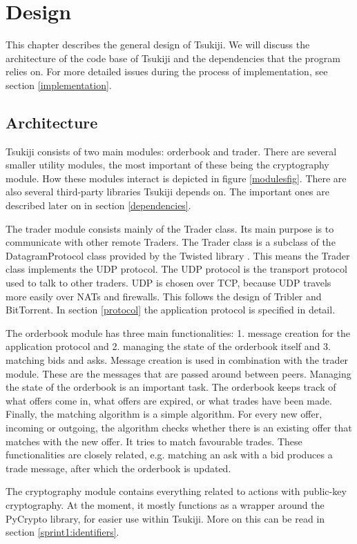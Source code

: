\section{Design}
This chapter describes the general design of Tsukiji.
We will discuss the architecture of the code base of Tsukiji and the dependencies that the program relies on.
For more detailed issues during the process of implementation, see section \ref{implementation}.

\subsection{Architecture}
Tsukiji consists of two main modules: orderbook and trader.
There are several smaller utility modules, the most important of these being the cryptography module.
How these modules interact is depicted in figure \ref{modulesfig}.
There are also several third-party libraries Tsukiji depends on.
The important ones are described later on in section \ref{dependencies}.

The trader module consists mainly of the Trader class.
Its main purpose is to communicate with other remote Traders.
The Trader class is a subclass of the DatagramProtocol class provided by the Twisted library \cite{twisted}.
This means the Trader class implements the UDP protocol.
The UDP protocol is the transport protocol used to talk to other traders.
UDP is chosen over TCP, because UDP travels more easily over NATs and firewalls.
This follows the design of Tribler and BitTorrent.
In section \ref{protocol} the application protocol is specified in detail.

The orderbook module has three main functionalities: 1. message creation for the application protocol and 2. managing the state of the orderbook itself and 3. matching bids and asks.
Message creation is used in combination with the trader module.
These are the messages that are passed around between peers.
Managing the state of the orderbook is an important task.
The orderbook keeps track of what offers come in, what offers are expired, or what trades have been made.
Finally, the matching algorithm is a simple algorithm.
For every new offer, incoming or outgoing, the algorithm checks whether there is an existing offer that matches with the new offer.
It tries to match favourable trades.
These functionalities are closely related, e.g. matching an ask with a bid produces a trade message, after which the orderbook is updated.

The cryptography module contains everything related to actions with public-key cryptography.
At the moment, it mostly functions as a wrapper around the PyCrypto library, for easier use within Tsukiji.
More on this can be read in section \ref{sprint1:identifiers}.

